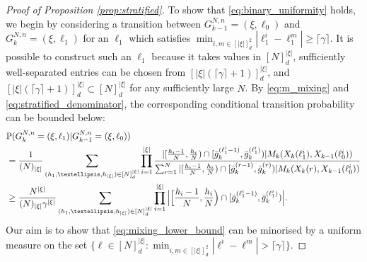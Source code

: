 \documentclass[a4paper,11pt]{article}
\theoremstyle{definition}
\newcommand{\bbP}{\mathbb{P}}
\begin{document}
\begin{proof}[Proof of Proposition \ref{prop:stratified}]
To show that \eqref{eq:binary_uniformity} holds, we begin by considering a transition between $G_{ k - 1 }^{ N, n } = ( \xi, \ell_0 )$ and $G_k^{ N, n } = ( \xi, \ell_1 )$ for an $\ell_1$ which satisfies $\min_{i, m \in [|\xi|]_d^2} | \ell_1^i - \ell_1^m| \geq \lceil \gamma \rceil$.
It is possible to construct such an $\ell_1$ because it takes values in $[N]_d^{|\xi|}$, sufficiently well-separated entries can be chosen from $[| \xi | ( \lceil \gamma \rceil + 1 )]_d^{|\xi|}$, and $[| \xi | ( \lceil \gamma \rceil + 1 )]_d^{|\xi|} \subset [N]_d^{|\xi|}$ for any sufficiently large $N$.
By \eqref{eq:m_mixing} and \eqref{eq:stratified_denominator}, the corresponding conditional transition probability can be bounded below:
\begin{align}
&\bbP( G_k^{ N, n } = ( \xi, \ell_1 ) | G_{ k - 1 }^{ N, n } = ( \xi, \ell_0 )  ) \notag \\
&= \frac{ 1 }{ ( N )_{ | \xi | } } \sum_{ ( h_1, \ldots, h_{ | \xi | } ) \in [ N ]_d^{ | \xi | } } \prod_{ i = 1 }^{ | \xi | } \frac{ | [ \frac{ h_i - 1 }{ N }, \frac{ h_i }{ N } ) \cap [ \bar{ g }_k^{ ( \ell_1^i - 1 ) }, \bar{ g }_k^{ ( \ell_1^i ) } ) | M_k( X_k( \ell_1^i ), X_{ k - 1 }( \ell_0^i ) ) }{ \sum_{ r = 1 }^N| [ \frac{ h_i - 1 }{ N }, \frac{ h_i }{ N } ) \cap [ \bar{ g }_k^{ ( r - 1 ) }, \bar{ g }_k^{ ( r ) } ) | M_k( X_k( r ), X_{ k - 1 }( \ell_0^i ) ) } \notag \\
&\geq \frac{ N^{ | \xi | } }{ ( N )_{ | \xi | } \gamma^{ | \xi | } } \sum_{ ( h_1, \ldots, h_{ | \xi | } ) \in [ N ]_d^{ | \xi | } } \prod_{ i = 1 }^{ | \xi | } \Big| \Big[ \frac{ h_i - 1 }{ N }, \frac{ h_i }{ N } \Big) \cap [ \bar{ g }_k^{ ( \ell_1^i - 1 ) }, \bar{ g }_k^{ ( \ell_1^i ) } ) \Big|. \label{eq:mixing_lower_bound}
\end{align}
Our aim is to show that \eqref{eq:mixing_lower_bound} can be minorised by a uniform measure on the set $\{ \ell \in [ N ]_d^{ | \xi | } : \min_{i, m \in [ | \xi | ]_d^2} | \ell^i - \ell^m | > \lceil \gamma \rceil \}$.


\end{proof}
\end{document}
